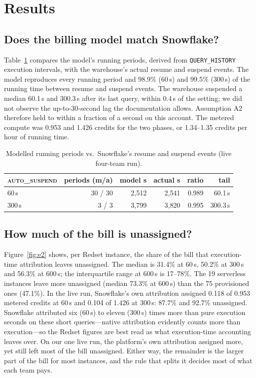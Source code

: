 \documentclass[sigconf]{acmart}
\newcommand{\autos}{\textsc{auto\_suspend}}
\begin{document}
\section{Results}
\subsection{Does the billing model match Snowflake?}\label{sec:e1}
Table~\ref{tab:e1} compares the model's running periods, derived from \texttt{QUERY\_HISTORY} execution intervals, with
the warehouse's actual resume and suspend events. The model reproduces every running period and 98.9\% (60\,s) and 99.5\%
(300\,s) of the running time between resume and suspend events. The warehouse suspended a median 60.1\,s and 300.3\,s after its last query, within 0.4\,s of
the setting; we did not observe the up-to-30-second lag the documentation allows. Assumption A2 therefore held to within a
fraction of a second on this account. The metered compute was 0.953 and 1.426 credits for the two phases, or
1.34--1.35 credits per hour of running time.

\begin{table}[t]
\caption{Modelled running periods vs.\ Snowflake's resume and suspend events (live four-team run).}\label{tab:e1}
\small
\begin{tabular}{lrrrrr}
\toprule
\autos & periods (m/a) & model s & actual s & ratio & tail \\
\midrule
60\,s  & 30 / 30 & 2{,}512 & 2{,}541 & 0.989 & 60.1\,s \\
300\,s & 3 / 3   & 3{,}799 & 3{,}820 & 0.995 & 300.3\,s \\
\bottomrule
\end{tabular}
\end{table}

\subsection{How much of the bill is unassigned?}\label{sec:e2}
Figure~\ref{fig:e2} shows, per Redset instance, the share of the bill that execution-time attribution leaves unassigned.
The median is 31.4\% at 60\,s, 50.2\% at 300\,s and 56.3\% at 600\,s; the interquartile range at 600\,s is 17--78\%.
The 19 serverless instances leave more unassigned (median 73.3\% at 600\,s) than the 75 provisioned ones (47.1\%). In the live run, Snowflake's own attribution assigned 0.118 of 0.953 metered credits at 60\,s and 0.104 of
1.426 at 300\,s: 87.7\% and 92.7\% unassigned. Snowflake attributed six (60\,s) to eleven (300\,s) times more than pure
execution seconds on these short queries---native attribution evidently counts more than execution---so the Redset figures
are best read as what execution-time accounting leaves over. On our one live run, the platform's own attribution assigned
more, yet still left most of the bill unassigned.
Either way, the remainder is the larger part of the bill for most instances, and the rule that splits it decides most of
what each team pays.
\end{document}

